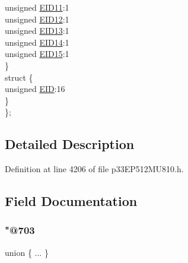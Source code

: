 \begin{DoxyCompactItemize}
\begin{tabbing}
\>\>unsigned \hyperlink{structtag_c1_r_x_f8_e_i_d_b_i_t_s_a710bdb0d602deb021b0be99066008018}{EID11}:1\\
\>\>unsigned \hyperlink{structtag_c1_r_x_f8_e_i_d_b_i_t_s_aa347bb85867bd8d4e0124f7cff8c6472}{EID12}:1\\
\>\>unsigned \hyperlink{structtag_c1_r_x_f8_e_i_d_b_i_t_s_a37d5f3edcbf6ef62f848fd4f3c584f79}{EID13}:1\\
\>\>unsigned \hyperlink{structtag_c1_r_x_f8_e_i_d_b_i_t_s_a7ffc0b0e0d99b8476b6f9a45337c17ab}{EID14}:1\\
\>\>unsigned \hyperlink{structtag_c1_r_x_f8_e_i_d_b_i_t_s_a293cd7dc1746257fa75a60cbd9383cd7}{EID15}:1\\
\>\} \\
\>struct \{\\
\>\>unsigned \hyperlink{structtag_c1_r_x_f8_e_i_d_b_i_t_s_ae80b378c9141f7c03e0b4e55b5f4b54d}{EID}:16\\
\>\} \\
\}; \\

\end{tabbing}\end{DoxyCompactItemize}


\subsection{Detailed Description}


Definition at line 4206 of file p33\+E\+P512\+M\+U810.\+h.



\subsection{Field Documentation}
\mbox{\label{structtag_c1_r_x_f8_e_i_d_b_i_t_s_a7d7767d3dec7f10b4e159a865a89dfef}} 
\subsubsection{\texorpdfstring{"@703}{@703}}
{\footnotesize\ttfamily union \{ ... \} }

\mbox{\label{structtag_c1_r_x_f8_e_i_d_b_i_t_s_ae80b378c9141f7c03e0b4e55b5f4b54d}} 
